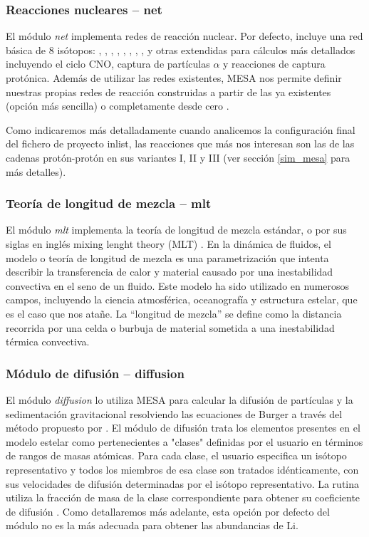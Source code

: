 \subsubsection{Reacciones nucleares – net} \label{reac_nuc}
El módulo \textit{net} implementa redes de reacción nuclear. Por defecto, incluye una red básica de 8 isótopos: , , , , , , , , y otras extendidas para cálculos más detallados incluyendo el ciclo CNO, captura de partículas $\alpha$ y reacciones de captura protónica. Además de utilizar las redes existentes, MESA nos permite definir nuestras propias redes de reacción construidas a partir de las ya existentes (opción más sencilla) o completamente desde cero \cite{Paxton2011}.\par

Como indicaremos más detalladamente cuando analicemos la configuración final del fichero de proyecto inlist, las reacciones que más nos interesan son las de las cadenas protón-protón en sus variantes I, II y III (ver sección \ref{sim_mesa} para más detalles).\par

\subsubsection{Teoría de longitud de mezcla – mlt}
El módulo \textit{mlt} implementa la teoría de longitud de mezcla estándar, o por sus siglas en inglés mixing lenght theory (MLT) \cite{Paxton2011}. En la dinámica de fluidos, el modelo o teoría de longitud de mezcla es una parametrización que intenta describir la transferencia de calor y material causado por una inestabilidad convectiva en el seno de un fluido. Este modelo ha sido utilizado en numerosos campos, incluyendo la ciencia atmosférica, oceanografía y estructura estelar, que es el caso que nos atañe. La “longitud de mezcla” se define como la distancia recorrida por una celda o burbuja de material sometida a una inestabilidad térmica convectiva.\par

\subsubsection{Módulo de difusión – diffusion} \label{subsec_diffusion}
El módulo \textit{diffusion} lo utiliza MESA para calcular la difusión de partículas y la sedimentación gravitacional resolviendo las ecuaciones de Burger \cite{Burgers1969} a través del método propuesto por \cite{Thoul1993}. El módulo de difusión trata los elementos presentes en el modelo estelar como pertenecientes a "clases" definidas por el usuario en términos de rangos de masas atómicas. Para cada clase, el usuario especifica un isótopo representativo y todos los miembros de esa clase son tratados idénticamente, con sus velocidades de difusión determinadas por el isótopo representativo. La rutina utiliza la fracción de masa de la clase correspondiente para obtener su coeficiente de difusión \cite{Paxton2015}. Como detallaremos más adelante, esta opción por defecto del módulo no es la más adecuada para obtener las abundancias de Li.\par

